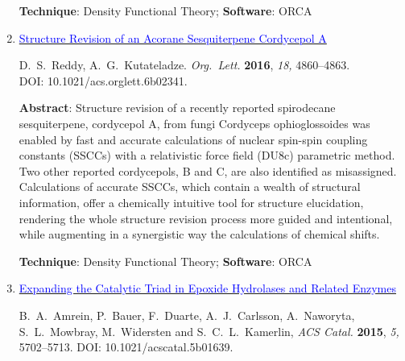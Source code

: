 \documentclass[10pt]{article}
\begin{document}
\begin{enumerate}
          \textbf{Technique}: Density Functional Theory;  \textbf{Software}: {ORCA}

          \vspace{0.5cm}

    \item \href{https://doi.org/10.1021/acs.orglett.6b02341}{\textcolor{blue}{Structure Revision of an Acorane Sesquiterpene Cordycepol A}}

        D.\ S.\ Reddy, A.\ G.\ Kutateladze. \textit{Org.\ Lett.} \textbf{2016}, \textit{18,} 4860--4863.\\DOI: 10.1021/acs.orglett.6b02341.
 
          \textbf{Abstract}: Structure revision of a recently reported spirodecane sesquiterpene, cordycepol A, from fungi Cordyceps ophioglossoides was enabled by fast and accurate calculations of nuclear spin-spin coupling constants (SSCCs) with a relativistic force field (DU8c) parametric method. Two other reported cordycepols, B and C, are also identified as misassigned. Calculations of accurate SSCCs, which contain a wealth of structural information, offer a chemically intuitive tool for structure elucidation, rendering the whole structure revision process more guided and intentional, while augmenting in a synergistic way the calculations of chemical shifts.

          \textbf{Technique}: Density Functional Theory; \textbf{Software}: {ORCA}

          \vspace{0.5cm}
  
    \item \href{https://doi.org/10.1021/acscatal.5b01639}{\textcolor{blue}{Expanding the Catalytic Triad in Epoxide Hydrolases and Related Enzymes}}

        B.\ A.\ Amrein, P.\ Bauer, F.\ Duarte, A.\ J.\ Carlsson, A.\ Naworyta, S.\ L.\ Mowbray, M.\ Widersten and S.\ C.\ L.\ Kamerlin, \textit{ACS Catal.} \textbf{2015}, \textit{5,} 5702--5713. DOI: 10.1021/acscatal.5b01639.


\end{enumerate}
\end{document}
